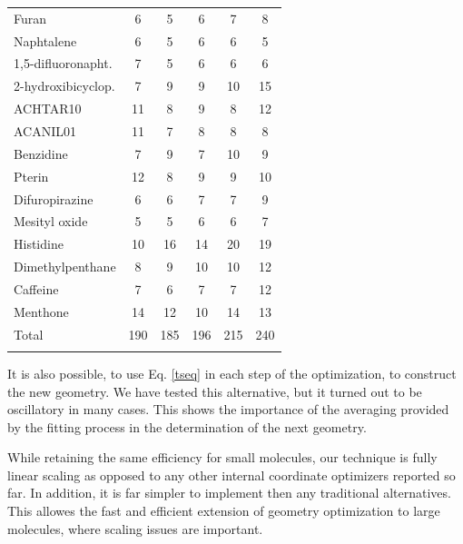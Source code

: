 \documentclass[prl,twocolumn,showpacs,twocolumngrid,superbib]{revtex4}
\begin{document}
\begin{table}[h]
\begin{tabular}{lccccc}
Furan                  &   6    &   5    &    6    &    7   &   8     \\
Naphtalene             &   6    &   5    &    6    &    6   &   5     \\
1,5-difluoronapht.     &   7    &   5    &    6    &    6   &   6     \\
2-hydroxibicyclop.     &   7    &   9    &    9    &   10   &  15     \\
ACHTAR10               &  11    &   8    &    9    &    8   &  12     \\
ACANIL01               &  11    &   7    &    8    &    8   &   8     \\
Benzidine              &   7    &   9    &    7    &   10   &   9     \\
Pterin                 &  12    &   8    &    9    &    9   &  10     \\
Difuropirazine         &   6    &   6    &    7    &    7   &   9     \\
Mesityl oxide          &   5    &   5    &    6    &    6   &   7     \\
Histidine              &  10    &  16    &   14    &   20   &  19     \\
Dimethylpenthane       &   8    &   9    &   10    &   10   &  12     \\
Caffeine               &   7    &   6    &    7    &    7   &  12     \\
Menthone               &  14    &  12    &   10    &   14   &  13     \\
\colrule
Total                  & 190    & 185    &  196    &  215   & 240     \\
\botrule
\end{tabular}
\end{table}

It is also possible, to use Eq. \ref{tseq} in 
each step of the optimization,
to construct the new geometry. We have tested this alternative,
but it turned out to be oscillatory in many cases. This shows the 
importance of the averaging provided by the fitting process in the
determination of the next geometry.

While retaining the same efficiency for small molecules, our technique
is fully linear scaling as opposed to any other internal 
coordinate optimizers reported so far. In addition, it is far simpler
to implement then any traditional alternatives.
This allowes the fast and efficient 
extension of geometry optimization 
to large molecules, where scaling issues are important.
\end{document}
